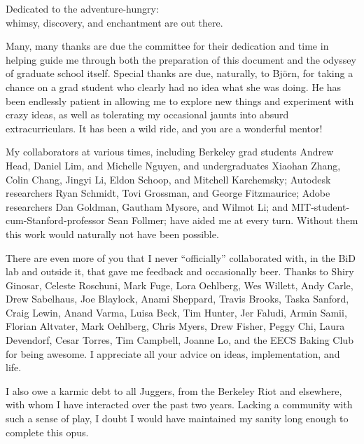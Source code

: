 \documentclass[oldfontcommands]{ucbthesis}
\begin{document}
\begin{frontmatter}

\begin{dedication}
\null\vfil
\begin{center}
Dedicated to the adventure-hungry:\\\vspace{12pt}
whimsy, discovery, and enchantment are out there.
\end{center}
\vfil\null
\end{dedication}

\tableofcontents
\clearpage
\listoffigures

\begin{acknowledgements}
Many, many thanks are due the committee for their dedication and time in helping guide me through both the preparation of this document and the odyssey of graduate school itself. Special thanks are due, naturally, to Bj\"orn, for taking a chance on a grad student who clearly had no idea what she was doing. He has been endlessly patient in allowing me to explore new things and experiment with crazy ideas, as well as tolerating my occasional jaunts into absurd extracurriculars. It has been a wild ride, and you are a wonderful mentor! 

My collaborators at various times, including Berkeley grad students Andrew Head, Daniel Lim, and Michelle Nguyen, and undergraduates Xiaohan Zhang, Colin Chang, Jingyi Li, Eldon Schoop, and Mitchell Karchemsky; Autodesk researchers Ryan Schmidt, Tovi Grossman, and George Fitzmaurice; Adobe researchers Dan Goldman, Gautham Mysore, and Wilmot Li; and MIT-student-cum-Stanford-professor Sean Follmer; have aided me at every turn. Without them this work would naturally not have been possible.

There are even more of you that I never ``officially'' collaborated with, in the BiD lab and outside it, that gave me feedback and occasionally beer. Thanks to Shiry Ginosar, Celeste Roschuni, Mark Fuge, Lora Oehlberg, Wes Willett, Andy Carle, Drew Sabelhaus, Joe Blaylock, Anami Sheppard, Travis Brooks, Taska Sanford, Craig Lewin, Anand Varma, Luisa Beck, Tim Hunter, Jer Faludi, Armin Samii, Florian Altvater, Mark Oehlberg, Chris Myers, Drew Fisher, Peggy Chi, Laura Devendorf, Cesar Torres, Tim Campbell, Joanne Lo, and the EECS Baking Club for being awesome. I appreciate all your advice on ideas, implementation, and life.

I also owe a karmic debt to all Juggers, from the Berkeley Riot and elsewhere, with whom I have interacted over the past two years. Lacking a community with such a sense of play, I doubt I would have maintained my sanity long enough to complete this opus.


\end{acknowledgements}
\end{frontmatter}
\end{document}
